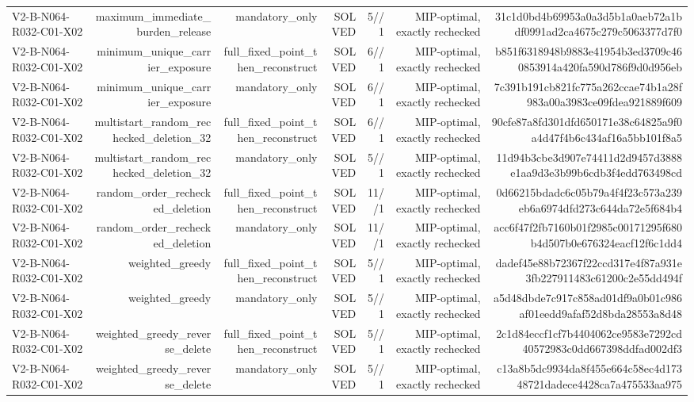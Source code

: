 {\begin{longtable}{lrrrrrr}
V2-B-N064-R032-C01-X02 & maximum\_immediate\_burden\_release & mandatory\_only & SOLVED & 5//1 & MIP-optimal, exactly rechecked & 31c1d0bd4b69953a0a3d5b1a0aeb72a1bdf0991ad2ca4675c279c5063377d7f0 \\
V2-B-N064-R032-C01-X02 & minimum\_unique\_carrier\_exposure & full\_fixed\_point\_then\_reconstruct & SOLVED & 6//1 & MIP-optimal, exactly rechecked & b851f6318948b9883e41954b3ed3709c460853914a420fa590d786f9d0d956eb \\
V2-B-N064-R032-C01-X02 & minimum\_unique\_carrier\_exposure & mandatory\_only & SOLVED & 6//1 & MIP-optimal, exactly rechecked & 7c391b191cb821fc775a262ccae74b1a28f983a00a3983ce09fdea921889f609 \\
V2-B-N064-R032-C01-X02 & multistart\_random\_rechecked\_deletion\_32 & full\_fixed\_point\_then\_reconstruct & SOLVED & 6//1 & MIP-optimal, exactly rechecked & 90cfe87a8fd301dfd650171e38c64825a9f0a4d47f4b6c434af16a5bb101f8a5 \\
V2-B-N064-R032-C01-X02 & multistart\_random\_rechecked\_deletion\_32 & mandatory\_only & SOLVED & 5//1 & MIP-optimal, exactly rechecked & 11d94b3cbe3d907e74411d2d9457d3888e1aa9d3e3b99b6cdb3f4edd763498cd \\
V2-B-N064-R032-C01-X02 & random\_order\_rechecked\_deletion & full\_fixed\_point\_then\_reconstruct & SOLVED & 11//1 & MIP-optimal, exactly rechecked & 0d66215bdadc6c05b79a4f4f23c573a239eb6a6974dfd273c644da72e5f684b4 \\
V2-B-N064-R032-C01-X02 & random\_order\_rechecked\_deletion & mandatory\_only & SOLVED & 11//1 & MIP-optimal, exactly rechecked & acc6f47f2fb7160b01f2985c00171295f680b4d507b0e676324eacf12f6c1dd4 \\
V2-B-N064-R032-C01-X02 & weighted\_greedy & full\_fixed\_point\_then\_reconstruct & SOLVED & 5//1 & MIP-optimal, exactly rechecked & dadef45e88b72367f22ccd317e4f87a931e3fb227911483c61200c2e55dd494f \\
V2-B-N064-R032-C01-X02 & weighted\_greedy & mandatory\_only & SOLVED & 5//1 & MIP-optimal, exactly rechecked & a5d48dbde7c917c858ad01df9a0b01c986af01eedd9afaf52d8bda28553a8d48 \\
V2-B-N064-R032-C01-X02 & weighted\_greedy\_reverse\_delete & full\_fixed\_point\_then\_reconstruct & SOLVED & 5//1 & MIP-optimal, exactly rechecked & 2c1d84eccf1cf7b4404062ce9583e7292cd40572983c0dd667398ddfad002df3 \\
V2-B-N064-R032-C01-X02 & weighted\_greedy\_reverse\_delete & mandatory\_only & SOLVED & 5//1 & MIP-optimal, exactly rechecked & c13a8b5dc9934da8f455e664c58ec4d17348721dadece4428ca7a475533aa975 \\

\end{longtable}}
